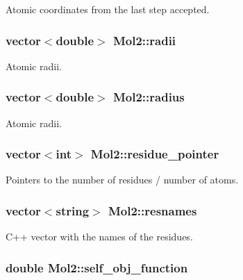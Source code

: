 Atomic coordinates from the last step accepted. 

\hypertarget{classMol2_a7b15edd05ff72f2d22479ad8f4d1429a}{
\subsubsection[{radii}]{\setlength{\rightskip}{0pt plus 5cm}vector$<$double$>$ {\bf Mol2::radii}}}
\label{classMol2_a7b15edd05ff72f2d22479ad8f4d1429a}


Atomic radii. 

\hypertarget{classMol2_ae7574bc736a4fcf91d269806af6dac56}{
\subsubsection[{radius}]{\setlength{\rightskip}{0pt plus 5cm}vector$<$double$>$ {\bf Mol2::radius}}}
\label{classMol2_ae7574bc736a4fcf91d269806af6dac56}


Atomic radii. 

\hypertarget{classMol2_af422c05d5d408a1b5d64522532ace2d3}{
\subsubsection[{residue\_\-pointer}]{\setlength{\rightskip}{0pt plus 5cm}vector$<$int$>$ {\bf Mol2::residue\_\-pointer}}}
\label{classMol2_af422c05d5d408a1b5d64522532ace2d3}


Pointers to the number of residues / number of atoms. 

\hypertarget{classMol2_ae90bc79def72332bc0673ad31ad73fdd}{
\subsubsection[{resnames}]{\setlength{\rightskip}{0pt plus 5cm}vector$<$string$>$ {\bf Mol2::resnames}}}
\label{classMol2_ae90bc79def72332bc0673ad31ad73fdd}


C++ vector with the names of the residues. 

\hypertarget{classMol2_adc7bfbbd47db76a1754510a21617a243}{
\subsubsection[{self\_\-obj\_\-function}]{\setlength{\rightskip}{0pt plus 5cm}double {\bf Mol2::self\_\-obj\_\-function}}}
\label{classMol2_adc7bfbbd47db76a1754510a21617a243}


